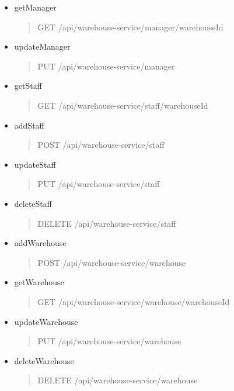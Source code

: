 \begin{itemize}
	\item getManager
	\begin{quote}
		GET /api/warehouse-service/manager/{warehouseId}
	\end{quote}

	\item updateManager
	\begin{quote}
		PUT /api/warehouse-service/manager
	\end{quote}

	\item getStaff
	\begin{quote}
		GET /api/warehouse-service/staff/{warehouseId}
	\end{quote}

	\item addStaff
	\begin{quote}
		POST /api/warehouse-service/staff
	\end{quote}

	\item updateStaff
	\begin{quote}
		PUT /api/warehouse-service/staff
	\end{quote}

	\item deleteStaff
	\begin{quote}
		DELETE /api/warehouse-service/staff
	\end{quote}

	\item addWarehouse
	\begin{quote}
		POST /api/warehouse-service/warehouse
	\end{quote}

	\item getWarehouse	
	\begin{quote}
		GET /api/warehouse-service/warehouse/{warehouseId}
	\end{quote}

	\item updateWarehouse
	\begin{quote}
		PUT /api/warehouse-service/warehouse
	\end{quote}

	\item deleteWarehouse
	\begin{quote}
		DELETE /api/warehouse-service/warehouse
	\end{quote}
\end{itemize}

